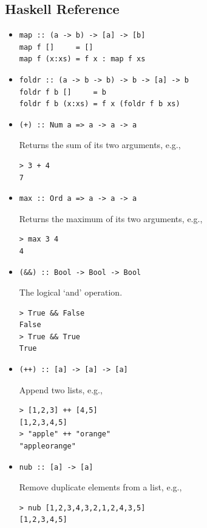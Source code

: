 \documentclass[addpoints]{exam}
\begin{document}
\newpage

\subsection*{Haskell Reference}

\begin{itemize}

\item
\begin{verbatim}
map :: (a -> b) -> [a] -> [b]
map f []     = []
map f (x:xs) = f x : map f xs
\end{verbatim}

\item
\begin{verbatim}
foldr :: (a -> b -> b) -> b -> [a] -> b
foldr f b []     = b
foldr f b (x:xs) = f x (foldr f b xs)
\end{verbatim}

\item
\begin{verbatim}
(+) :: Num a => a -> a -> a
\end{verbatim}
Returns the sum of its two arguments, e.g.,
\begin{verbatim}
> 3 + 4
7
\end{verbatim}

\item
\begin{verbatim}
max :: Ord a => a -> a -> a
\end{verbatim}
Returns the maximum of its two arguments, e.g.,
\begin{verbatim}
> max 3 4
4
\end{verbatim}

\item
\begin{verbatim}
(&&) :: Bool -> Bool -> Bool
\end{verbatim}
The logical `and' operation.
\begin{verbatim}
> True && False
False
> True && True
True
\end{verbatim}

\item
\begin{verbatim}
(++) :: [a] -> [a] -> [a]
\end{verbatim}
Append two lists, e.g.,
\begin{verbatim}
> [1,2,3] ++ [4,5]
[1,2,3,4,5]
> "apple" ++ "orange"
"appleorange"
\end{verbatim}

\item 
\begin{verbatim}
nub :: [a] -> [a]
\end{verbatim}
Remove duplicate elements from a list, e.g.,
\begin{verbatim}
> nub [1,2,3,4,3,2,1,2,4,3,5]
[1,2,3,4,5]
\end{verbatim}


\end{itemize}
\end{document}

